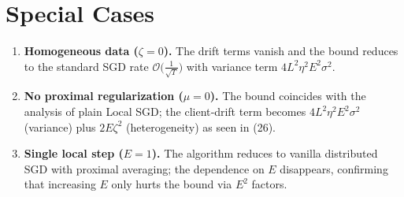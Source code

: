 \documentclass{article}
\begin{document}
\section*{Special Cases}
\begin{enumerate}
\item \textbf{Homogeneous data ($\zeta=0$).}  The drift terms vanish and the bound reduces to the standard SGD rate $ \mathcal O\bigl(\frac{1}{\sqrt{T}}\bigr)$ with variance term $4L^2\eta^2E^2\sigma^2$.
\item \textbf{No proximal regularization ($\mu=0$).}  The bound coincides with the analysis of plain Local SGD; the client‑drift term becomes $4L^2\eta^2E^2\sigma^2$ (variance) plus $2E\zeta^2$ (heterogeneity) as seen in (26).
\item \textbf{Single local step ($E=1$).}  The algorithm reduces to vanilla distributed SGD with proximal averaging; the dependence on $E$ disappears, confirming that increasing $E$ only hurts the bound via $E^2$ factors.
\end{enumerate}
\end{document}
